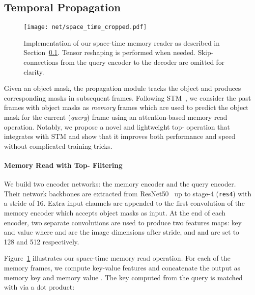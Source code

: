 \documentclass[final]{cvpr}
\begin{document}
	\subsection{Temporal Propagation}\label{prop}
	
	\begin{figure}[t]
		\begin{center}
			\texttt{[image: net/space\_time\_cropped.pdf]}
		\end{center}
		\vspace{-0.15in}
		\caption{
			Implementation of our space-time memory reader as described in Section~\ref{prop}. Tensor reshaping is performed when needed. Skip-connections from the query encoder to the decoder are omitted for clarity. }
		\label{fig:spacetime}
		\vspace{-0.15in}
	\end{figure}
	Given an object mask, the propagation module tracks the object and produces corresponding masks in subsequent frames. Following STM~\cite{oh2019videoSTM}, we consider the past frames with object masks as \textit{memory} frames which are used to predict the object mask for the current  (\textit{query}) frame using an attention-based memory read operation. Notably, we propose a novel and lightweight top- operation that integrates with STM and show that it improves both performance and speed without complicated training tricks.


	
	\paragraph{Memory Read with Top- Filtering}
	We build two encoder networks: the memory encoder and the query encoder. Their network backbones are extracted from ResNet50~\cite{he2016deepResNet} up to stage-4 ({\tt res4}) with a stride of 16. 
	Extra input channels are appended to the first convolution of the memory encoder which accepts object masks as input. 
	At the end of each encoder, two separate convolutions are used to produce two features maps: key  and value  where  and  are the image dimensions after stride, and  and  are set to 128 and 512 respectively. 
	
	
	Figure~\ref{fig:spacetime} illustrates our space-time memory read operation. For each of the  memory frames, we compute key-value features and concatenate the output as memory key  and memory value . The key  computed from the query is matched with  via a dot product:
	
\end{document}
